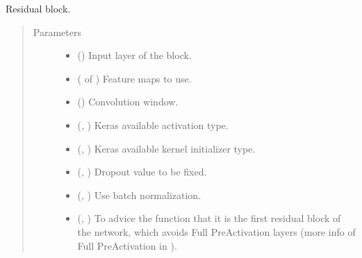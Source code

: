 \documentclass[letterpaper,10pt,english]{sphinxmanual}
\begin{document}
\begin{fulllineitems}
\label{\detokenize{models/resunet:models.resunet.residual_block}}
Residual block.
\begin{quote}\begin{description}
\item[{Parameters}] \leavevmode\begin{itemize}
\item {} 
 () \textendash{} Input layer of the block.

\item {} 
 ( of ) \textendash{} Feature maps to use.

\item {} 
 () \textendash{} Convolution window.

\item {} 
 (, ) \textendash{} Keras available activation type.

\item {} 
 (, ) \textendash{} Keras available kernel initializer type.

\item {} 
 (, ) \textendash{} Dropout value to be fixed.

\item {} 
 (, ) \textendash{} Use batch normalization.

\item {} 
 (, ) \textendash{} To advice the function that it is the first residual block of the network, which avoids Full Pre\sphinxhyphen{}Activation
layers (more info of Full Pre\sphinxhyphen{}Activation in ).


\end{itemize}
\end{description}
\end{quote}
\end{fulllineitems}
\end{document}
